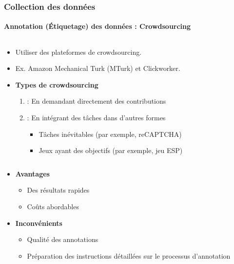 \documentclass[xcolor=table]{beamer}
\begin{document}
\begin{frame}
\frametitle{Collection des données}
\framesubtitle{Annotation (Étiquetage) des données : Crowdsourcing}

\begin{columns}
\begin{column}{0.78\textwidth}
\begin{itemize}
	\item Utiliser des plateformes de crowdsourcing.
	\item Ex. Amazon Mechanical Turk (MTurk) et Clickworker.
	\item \textbf{Types de crowdsourcing}
	\begin{enumerate}
		\item {} : En demandant directement des contributions
		\item {} : En intégrant des tâches dans d’autres formes
		\begin{itemize}
			\item Tâches inévitables (par exemple, reCAPTCHA)
			\item Jeux ayant des objectifs (par exemple, jeu ESP)
		\end{itemize}
	\end{enumerate}
\end{itemize}
\end{column}
\begin{column}{0.22\textwidth}
\end{column}
\end{columns}

\begin{itemize}
	\item \textbf{Avantages} 
	\begin{itemize}
		\item Des résultats rapides
		\item Coûts abordables
	\end{itemize}
	\item \textbf{Inconvénients}
	\begin{itemize}
		\item Qualité des annotations
		\item Préparation des instructions détaillées sur le processus d'annotation
	\end{itemize}
\end{itemize}

\end{frame}
\end{document}
